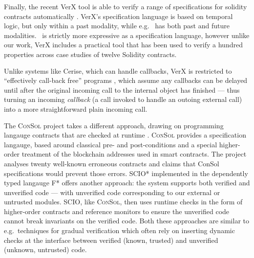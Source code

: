 

Finally, the recent VerX tool is able to verify a range of
specifications for solidity contracts automatically \cite{VerX}.
VerX's specification language is based on
temporal logic, 
but only within a past modality, while e.g.\ \citet{OOPSLA22} has both past
and future modalities.
\Chainmail\ is strictly more expressive as a
specification language,
%
however unlike
%
our work, VerX includes a practical tool that has
been used to verify   a hundred properties across case studies of
twelve Solidity contracts.
 

Unlike systems like Cerise, which can handle callbacks, VerX
is restricted to ``effectively call-back free'' programs
\cite{Grossman,Albert,relaxed-callbacks-ToDES}, which assume any callbacks can be delayed until after the
original incoming call to the internal object has finished 
--- thus turning an incoming \textit{callback} (a call invoked 
to handle an outoing external call) into a more straightforward plain
incoming call. 


The \textsc{ConSol} project \cite{consolidating-pldi2024} takes a
different approach, drawing on programming langauge contracts that are
checked at runtime \cite{FinFel01}. \textsc{ConSol} provides a
specification langauge, based around classical pre- and post-conditions and
a special higher-order treatment of the blockchain addresses used in
smart contracts. The project analyses twenty well-known erroneous
contracts and claims that ConSol specifications would prevent those
errors.
SCIO* \cite{secure-io-fstar-popl2024} implemented in the dependently
typed langauge F* offers another approach: the system supports both
verified and unverified code --- with unverified code 
corresponding to our external or untrusted modules.  SCIO,
like \textsc{ConSol}, then uses runtime checks in the form of
higher-order contracts and reference monitors to ensure the unverified
code cannot break invariants on the verified code. Both these
approaches are similar to e.g.\  techniques for gradual
verification \cite{gradual-verification-popl2024,Cok2022} which often
rely on inserting dynamic checks at the interface between verified
(known, trusted) and unverified (unknown, untrusted) code.



